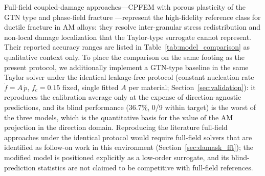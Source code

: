 \documentclass[12pt,a4paper,twocolumn]{article}
\begin{document}
Full-field coupled-damage approaches---CPFEM with porous plasticity of the GTN type \cite{zhang2021modeling} and phase-field fracture \cite{liu2022phase}---represent the high-fidelity reference class for ductile fracture in AM alloys: they resolve inter-granular stress redistribution and non-local damage localization that the Taylor-type surrogate cannot represent. Their reported accuracy ranges are listed in Table~\ref{tab:model_comparison} as qualitative context only. To place the comparison on the same footing as the present protocol, we additionally implement a GTN-type baseline in the same Taylor solver under the identical leakage-free protocol (constant nucleation rate $\dot f = A\,\dot p$, $f_c = 0.15$ fixed, single fitted $A$ per material; Section~\ref{sec:validation}): it reproduces the calibration average only at the expense of direction-agnostic predictions, and its blind performance (36.7\%, 0/9 within target) is the worst of the three models, which is the quantitative basis for the value of the AM projection in the direction domain. Reproducing the literature full-field approaches under the identical protocol would require full-field solvers that are identified as follow-on work in this environment (Section~\ref{sec:damask_fft}); the modified model is positioned explicitly as a low-order surrogate, and its blind-prediction statistics are not claimed to be competitive with full-field references.
\end{document}
